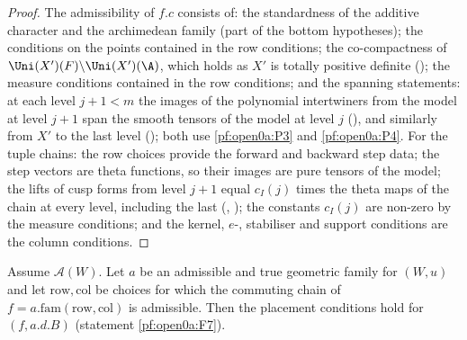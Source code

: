 \begin{proof}
The admissibility of $f.c$ consists of: the standardness of the additive character and the archimedean family (part of
the bottom hypotheses); the conditions on the points contained in the row conditions; the co-compactness of
$\Uni(X')(F)\backslash\Uni(X')(\A)$, which holds as $X'$ is totally positive definite
(); the measure conditions contained in the row
conditions; and the spanning statements: at each level $j+1<m$ the images of the polynomial intertwiners from the model
at level $j+1$ span the smooth tensors of the model at level $j$ (), and
similarly from $X'$ to the last level (); both use \ref{pf:open0a:P3}
and \ref{pf:open0a:P4}. For the tuple chains: the row choices provide the forward and backward step data; the step
vectors are theta functions, so their images are pure tensors of the model; the lifts of cusp forms from level $j+1$
equal $c_I(j)$ times the theta maps of the chain at every level, including the last
(, ); the
constants $c_I(j)$ are non-zero by the measure conditions; and the kernel, $e$-, stabiliser and support conditions are
the column conditions.
\end{proof}

\begin{proposition}\label{pf:open0a:placed}
Assume $\mathcal A(W)$. Let $a$ be an admissible and true geometric family for $(W,u)$ and let $\mathrm{row},\mathrm{col}$
be choices for which the commuting chain of $f=a.\mathrm{fam}(\mathrm{row},\mathrm{col})$ is admissible. Then the placement
conditions hold for $(f,a.d.B)$ (statement \ref{pf:open0a:F7}).
\end{proposition}

